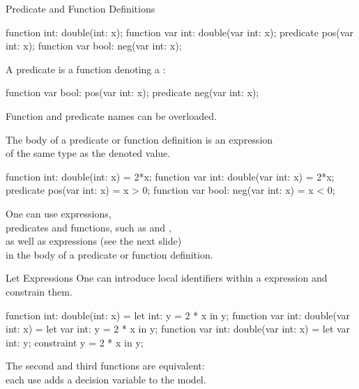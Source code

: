 \documentclass{cons-beamer}
\begin{document}
\begin{flashcardminizinc}
\begin{frame}[fragile]{Predicate and Function Definitions}\label{PredDef}
  \begin{examples}
    \begin{mzn}
function int: double(int: x);
function var int: double(var int: x);
predicate pos(var int: x);
function var bool: neg(var int: x);
    \end{mzn}
  \end{examples}\vfill
  A predicate is a function denoting a :
  \begin{examples}
    \begin{mzn}[firstnumber=3]
function var bool: pos(var int: x);
predicate neg(var int: x);
    \end{mzn}
  \end{examples}
  Function and predicate names can be overloaded.
\end{frame}

\begin{frame}[fragile]
  The body of a predicate or function definition is an expression \\ of
  the same type as the denoted value.
  \begin{examples}
    \begin{mzn}
function int: double(int: x) = 2*x;
function var int: double(var int: x) = 2*x;
predicate pos(var int: x) = x > 0;
function var bool: neg(var int: x) = x < 0;
    \end{mzn}
  \end{examples}
  One can use  expressions, \\ predicates and functions, such
  as  and , \\ as well as
   expressions (see the next slide) \\ in the body of a
  predicate or function definition.
\end{frame}

\begin{frame}[fragile]{Let Expressions}
  One can introduce local identifiers within a 
  expression and constrain them.
  \begin{examples}
    \begin{mzn}
function int: double(int: x) =
  let { int: y = 2 * x } in y;
function var int: double(var int: x) = 
  let { var int: y = 2 * x } in y;
function var int: double(var int: x) =
  let { var int: y;
        constraint y = 2 * x
  } in y;
    \end{mzn}
    The second and third functions are equivalent: \\ each use adds a
    decision variable to the model.
  \end{examples}
\end{frame}


\end{flashcardminizinc}
\end{document}
